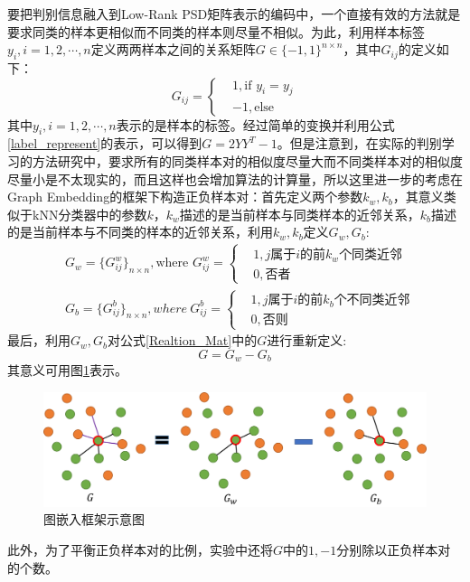 要把判别信息融入到Low-Rank PSD矩阵表示的编码中，一个直接有效的方法就是要求同类的样本更相似而不同类的样本则尽量不相似。为此，利用样本标签$y_{i},i=1,2,\cdots,n$定义两两样本之间的关系矩阵$G\in\{-1,1\}^{n\times n}$，其中$G_{ij}$的定义如下：
\begin{equation}
\label{Realtion_Mat}
G_{ij}=\left\{
\begin{split}
&1,\text{if }y_i=y_j\\
&-1,\text{else}
\end{split}
\right.
\end{equation}
其中$y_i,i=1,2,\cdots,n$表示的是样本的标签。经过简单的变换并利用公式\ref{label_represent}的表示，可以得到$G=2YY^{T}-1$。但是注意到，在实际的判别学习的方法研究中，要求所有的同类样本对的相似度尽量大而不同类样本对的相似度尽量小是不太现实的，而且这样也会增加算法的计算量，所以这里进一步的考虑在Graph Embedding\cite{Graph_Embeding}的框架下构造正负样本对：首先定义两个参数$k_w,k_b$，其意义类似于kNN分类器中的参数$k$，$k_w$描述的是当前样本与同类样本的近邻关系，$k_b$描述的是当前样本与不同类的样本的近邻关系，利用$k_w,k_b$定义$G_w,G_b$:
\begin{equation}
\label{GE_Gw_Gb}
\begin{split}
&G_w=\{G^{w}_{ij}\}_{n \times n},\text{where }G^{w}_{ij}=\left\{
\begin{split}
&1,\text{$j$属于$i$的前$k_w$个同类近邻}\\
&0,\text{否者}
\end{split}
\right.\\
&G_b=\{G^{b}_{ij}\}_{n \times n},where~G^{b}_{ij}=\left\{
\begin{split}
&1,\text{$j$属于$i$的前$k_b$个不同类近邻}\\
&0,\text{否则}
\end{split}
\right.
\end{split}
\end{equation}
最后，利用$G_w,G_b$对公式\ref{Realtion_Mat}中的$G$进行重新定义:
\begin{equation}
\label{Graph_Mat}
G=G_w-G_b
\end{equation}
其意义可用图\ref{fig:Graph_Embedding}表示。
\begin{figure}[hbt]
	\centering
	\includegraphics[width=\linewidth]{source/Graph_Embedding.png}
	\caption{图嵌入框架示意图}
	\label{fig:Graph_Embedding}
\end{figure}
此外，为了平衡正负样本对的比例，实验中还将$G$中的$1,-1$分别除以正负样本对的个数。

